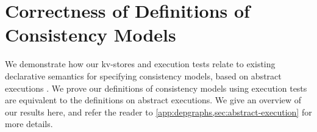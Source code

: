 \section{Correctness of Definitions of Consistency Models}
\label{sec:other_formalisms}

We demonstrate how our kv-stores and execution 
tests relate to existing declarative semantics for specifying  
consistency models, based on abstract executions \cite{framework-concur}. 
We prove our definitions of consistency models using execution tests
are equivalent to the definitions on abstract executions.
We give an overview of our results here, and refer the reader to \cref{app:depgraphs,sec:abstract-execution}
for more details.


